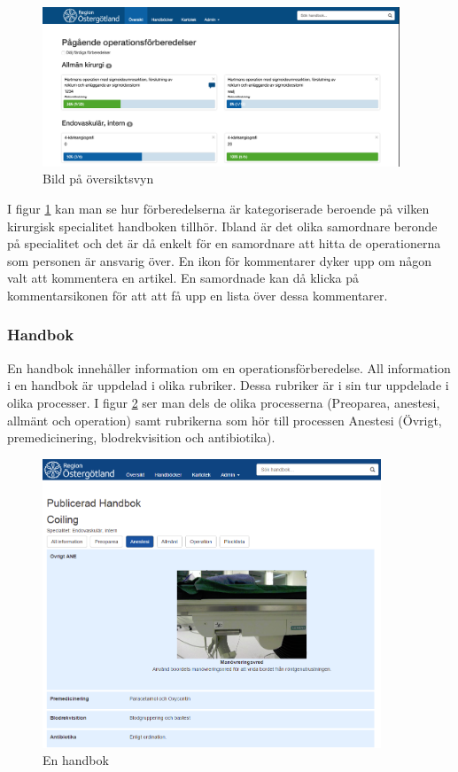\begin{figure}[h!]
  \centering
  \includegraphics[width=0.95\textwidth]{images/site/overview.png}
  \caption{Bild på översiktsvyn}
  \label{fig:siteoverview}
\end{figure}

I figur \ref{fig:siteoverview} kan man se hur förberedelserna är kategoriserade beroende på vilken kirurgisk specialitet handboken tillhör.
Ibland är det olika samordnare beronde på specialitet och det är då enkelt för en samordnare att hitta de operationerna som personen är ansvarig över.
En ikon för kommentarer dyker upp om någon valt att kommentera en artikel. En samordnade kan då klicka på kommentarsikonen för att att få upp en lista över dessa kommentarer.

\subsubsection{Handbok}
En handbok innehåller information om en operationsförberedelse. All information i en handbok är uppdelad i olika rubriker. Dessa rubriker är i sin tur uppdelade i olika processer.
I figur \ref{fig:handbok} ser man dels de olika processerna (Preoparea, anestesi, allmänt och operation) samt rubrikerna som hör till processen Anestesi (Övrigt, premedicinering, blodrekvisition och  antibiotika).

\begin{figure}[h!]
  \centering
  \includegraphics[width=0.9\textwidth]{images/site/handbok.png}
  \caption{En handbok}
  \label{fig:handbok}
\end{figure}


